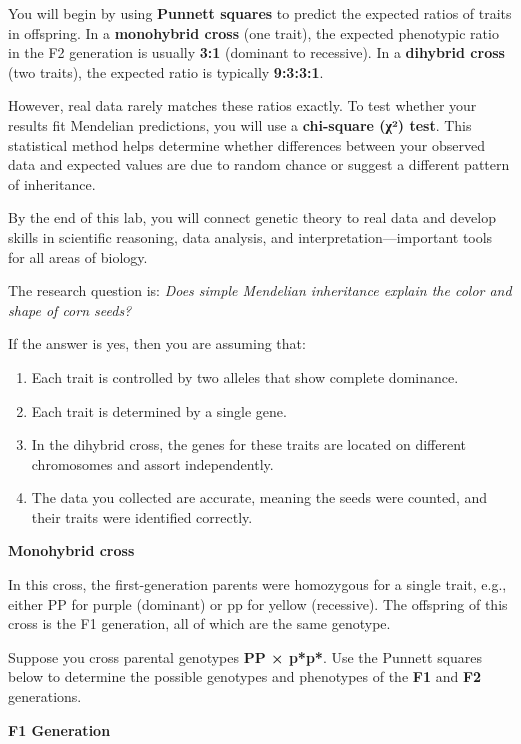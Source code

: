 \documentclass[
  letterpaper,
  DIV=11,
  numbers=noendperiod]{scrreprt}
\begin{document}
You will begin by using \textbf{Punnett squares} to predict the expected
ratios of traits in offspring. In a \textbf{monohybrid cross} (one
trait), the expected phenotypic ratio in the F2 generation is usually
\textbf{3:1} (dominant to recessive). In a \textbf{dihybrid cross} (two
traits), the expected ratio is typically \textbf{9:3:3:1}.

However, real data rarely matches these ratios exactly. To test whether
your results fit Mendelian predictions, you will use a
\textbf{chi-square (χ²) test}. This statistical method helps determine
whether differences between your observed data and expected values are
due to random chance or suggest a different pattern of inheritance.

By the end of this lab, you will connect genetic theory to real data and
develop skills in scientific reasoning, data analysis, and
interpretation---important tools for all areas of biology.

The research question is: \emph{Does simple Mendelian inheritance
explain the color and shape of corn seeds?}

If the answer is yes, then you are assuming that:

\begin{enumerate}
\def\labelenumi{\arabic{enumi}.}
\item
  Each trait is controlled by two alleles that show complete dominance.
\item
  Each trait is determined by a single gene.
\item
  In the dihybrid cross, the genes for these traits are located on
  different chromosomes and assort independently.
\item
  The data you collected are accurate, meaning the seeds were counted,
  and their traits were identified correctly.
\end{enumerate}

\textbf{Monohybrid cross}

In this cross, the first-generation parents were homozygous for a single
trait, e.g., either PP for purple (dominant) or pp for yellow
(recessive). The offspring of this cross is the F1 generation, all of
which are the same genotype.

Suppose you cross parental genotypes \textbf{PP × p*p*}. Use the Punnett
squares below to determine the possible genotypes and phenotypes of the
\textbf{F1} and \textbf{F2} generations.

\textbf{F1 Generation}
\end{document}
